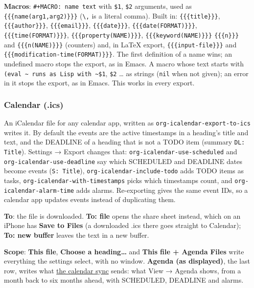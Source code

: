 \documentclass[11pt]{article}
\begin{document}
\textbf{Macros}: \texttt{\#+MACRO: name text} with \texttt{\$1}, \texttt{\$2} arguments, used as \texttt{\{\{\{name(arg1,arg2)\}\}\}} (\texttt{\textbackslash{},} is a literal comma). Built in: \texttt{\{\{\{title\}\}\}}, \texttt{\{\{\{author\}\}\}}, \texttt{\{\{\{email\}\}\}}, \texttt{\{\{\{date\}\}\}}, \texttt{\{\{\{date(FORMAT)\}\}\}}, \texttt{\{\{\{time(FORMAT)\}\}\}}, \texttt{\{\{\{property(NAME)\}\}\}}, \texttt{\{\{\{keyword(NAME)\}\}\}} \texttt{\{\{\{n\}\}\}} and \texttt{\{\{\{n(NAME)\}\}\}} (counters) and, in \LaTeX{} export, \texttt{\{\{\{input-file\}\}\}} and \texttt{\{\{\{modification-time(FORMAT)\}\}\}}. The first definition of a name wins; an undefined macro stops the export, as in Emacs. A macro whose text starts with \texttt{(eval \textasciitilde{} runs as Lisp with \textasciitilde{}\$1}, \texttt{\$2} \ldots{} as strings (\texttt{nil} when not given); an error in it stops the export, as in Emacs. This works in every export.

\subsubsection{Calendar (.ics)}
\label{sec:org03b3732}

An iCalendar file for any calendar app, written as \texttt{org-icalendar-export-to-ics} writes it. By default the events are the active timestamps in a heading's title and text, and the DEADLINE of a heading that is not a TODO item (summary \texttt{DL: Title}). Settings → Export changes that: \texttt{org-icalendar-use-scheduled} and \texttt{org-icalendar-use-deadline} say which SCHEDULED and DEADLINE dates become events (\texttt{S: Title}), \texttt{org-icalendar-include-todo} adds TODO items as tasks, \texttt{org-icalendar-with-timestamps} picks which timestamps count, and \texttt{org-icalendar-alarm-time} adds alarms. Re-exporting gives the same event IDs, so a calendar app updates events instead of duplicating them.

\textbf{To}: the file is downloaded. \textbf{To: file} opens the share sheet instead, which on an iPhone has \textbf{Save to Files} (a downloaded .ics there goes straight to Calendar); \textbf{To: new buffer} leaves the text in a new buffer.

\textbf{Scope}: \textbf{This file}, \textbf{Choose a heading…} and \textbf{This file + Agenda Files} write everything the settings select, with no window. \textbf{Agenda (as displayed)}, the last row, writes what \hyperref[sec:orge18f01c]{the calendar sync} sends: what View → Agenda shows, from a month back to six months ahead, with SCHEDULED, DEADLINE and alarms.
\end{document}
